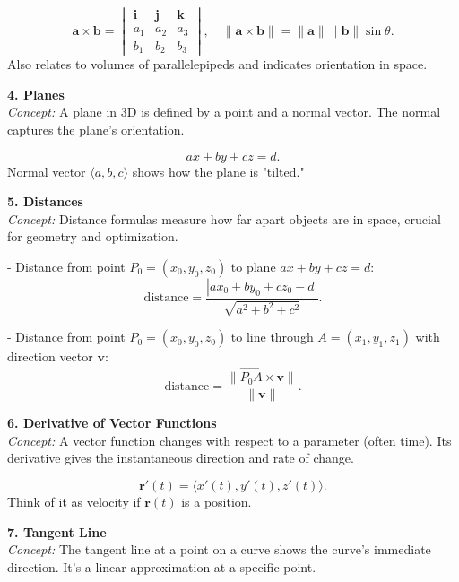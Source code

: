 \documentclass[9pt]{article}
\begin{document}
\begin{multicols}{2}
\begin{tcolorbox}[title=, colframe=brightpink]
\[
\mathbf{a}\times \mathbf{b} = \begin{vmatrix}
\mathbf{i} & \mathbf{j} & \mathbf{k}\\
a_1 & a_2 & a_3 \\
b_1 & b_2 & b_3
\end{vmatrix}, \quad \|\mathbf{a}\times \mathbf{b}\|=\|\mathbf{a}\|\|\mathbf{b}\|\sin\theta.
\]
Also relates to volumes of parallelepipeds and indicates orientation in space.
\end{tcolorbox}

\begin{tcolorbox}[title=, colframe=brightyellow]
\textbf{4. Planes}\\
\textit{Concept:} A plane in 3D is defined by a point and a normal vector. The normal captures the plane's orientation.

\[
ax+by+cz=d.
\]
Normal vector $\langle a,b,c\rangle$ shows how the plane is "tilted."
\end{tcolorbox}

\begin{tcolorbox}[title=, colframe=brightblue]
\textbf{5. Distances}\\
\textit{Concept:} Distance formulas measure how far apart objects are in space, crucial for geometry and optimization.

- Distance from point $P_0=(x_0,y_0,z_0)$ to plane $ax+by+cz=d$:
\[
\text{distance} = \frac{|ax_0+by_0+cz_0 - d|}{\sqrt{a^2 + b^2 + c^2}}.
\]

- Distance from point $P_0=(x_0,y_0,z_0)$ to line through $A=(x_1,y_1,z_1)$ with direction vector $\mathbf{v}$:
\[
\text{distance}=\frac{\|\overrightarrow{P_0A}\times \mathbf{v}\|}{\|\mathbf{v}\|}.
\]
\end{tcolorbox}

\begin{tcolorbox}[title=, colframe=brightgreen]
\textbf{6. Derivative of Vector Functions}\\
\textit{Concept:} A vector function changes with respect to a parameter (often time). Its derivative gives the instantaneous direction and rate of change.

\[
\mathbf{r}'(t)=\langle x'(t),y'(t),z'(t)\rangle.
\]
Think of it as velocity if $\mathbf{r}(t)$ is a position.
\end{tcolorbox}

\begin{tcolorbox}[title=, colframe=brightpink]
\textbf{7. Tangent Line}\\
\textit{Concept:} The tangent line at a point on a curve shows the curve's immediate direction. It’s a linear approximation at a specific point.


\end{tcolorbox}
\end{multicols}
\end{document}
